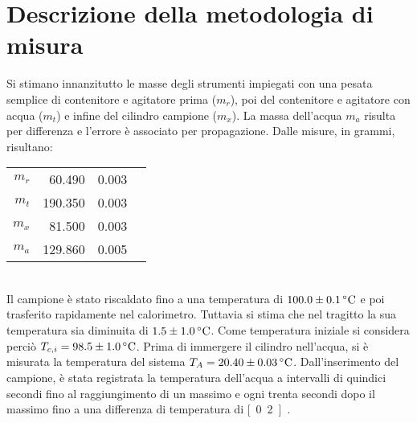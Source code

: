 \documentclass[italian,a4paper]{article}
\begin{document}
\section{Descrizione della metodologia di misura}
Si stimano innanzitutto le masse degli strumenti impiegati con una pesata semplice di contenitore e agitatore prima ($m_r$), poi del contenitore e agitatore con acqua ($m_t$) e infine del cilindro campione ($m_x$). La massa dell'acqua $m_a$ risulta per differenza e l'errore è associato per propagazione. Dalle misure, in grammi, risultano:
\begin{table}[h]\centering
\begin{tabular}{r@{$=$}r@{$\pm$}ll}
 $m_r$ & 60.490 &0.003\\
 $m_t$ & 190.350&0.003\\
 $m_x$ & 81.500&0.003\\
 $m_a$ & 129.860&0.005
\end{tabular}
\end{table}\\
Il campione è stato riscaldato fino a una temperatura di $\unit[100.0\pm0.1]{\celsius}$ e poi trasferito rapidamente nel calorimetro. Tuttavia si stima che nel tragitto la sua temperatura sia diminuita di $\unit[1.5\pm1.0]{\celsius}$. Come temperatura iniziale si considera perciò $T_{c,i} = \unit[98.5\pm1.0]{\celsius}$. Prima di immergere il cilindro nell'acqua, si è misurata la temperatura del sistema $T_A = \unit[20.40\pm0.03]{\celsius}$.
Dall'inserimento del campione, è stata registrata la temperatura dell'acqua a intervalli di quindici secondi fino al raggiungimento di un massimo e ogni trenta secondi dopo il massimo fino a una differenza di temperatura di \unit[0.2]{\celsius}.
\end{document}
